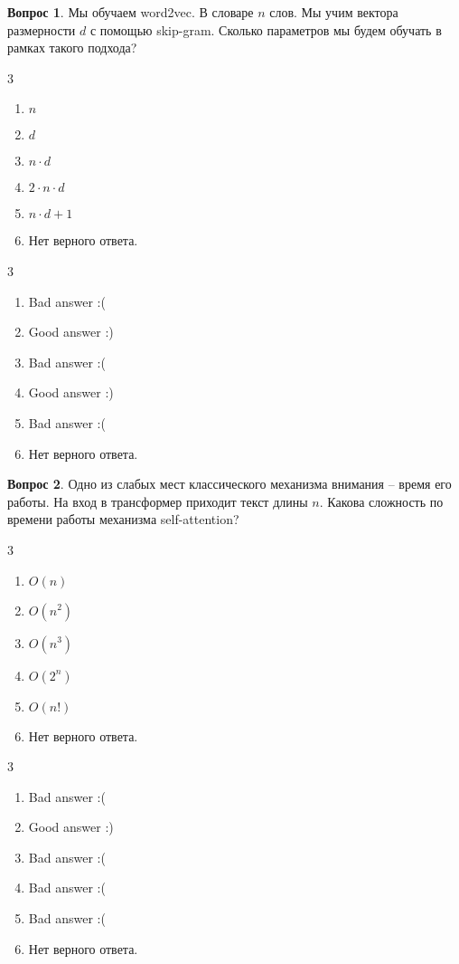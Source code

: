 \documentclass[12pt]{article}
\newenvironment{answerlist}[1][3]{
\begin{multicols}{#1}

\begin{enumerate}[label=\fbox{\emph{\Alph*}},ref=\emph{\alph*}]
}
{
\item Нет верного ответа.
\end{enumerate}
\end{multicols}
}
\theoremstyle{definition}
\newtheorem{question}{Вопрос}
\begin{document}
\begin{question}
Мы обучаем word2vec. В словаре $n$ слов. Мы учим вектора размерности $d$ с помощью skip-gram. Сколько параметров мы будем обучать в рамках такого подхода? 
\begin{answerlist}
  \item  $n$
  \item  $d$
  \item  $n \cdot d$
  \item  $2 \cdot n \cdot d$
  \item  $n \cdot d + 1$
\end{answerlist}
\end{question}

\begin{solution}
\begin{answerlist}
  \item Bad answer :(
  \item Good answer :)
  \item Bad answer :(
  \item Good answer :)
  \item Bad answer :(
\end{answerlist}
\end{solution}


\begin{question}
Одно из слабых мест классического механизма внимания -- время его работы. На вход в трансформер приходит текст длины $n$. Какова сложность по времени работы механизма self-attention? 
\begin{answerlist}
  \item $O(n)$
  \item $O(n^2)$
  \item $O(n^3)$
  \item $O(2^n)$
  \item $O(n!)$
\end{answerlist}
\end{question}

\begin{solution}
\begin{answerlist}
  \item Bad answer :(
  \item Good answer :)
  \item Bad answer :(
  \item Bad answer :(
  \item Bad answer :(
\end{answerlist}
\end{solution}
\end{document}
